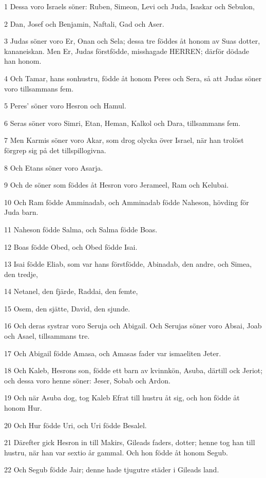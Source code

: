 \par 1 Dessa voro Israels söner: Ruben, Simeon, Levi och Juda, Isaskar och Sebulon,
\par 2 Dan, Josef och Benjamin, Naftali, Gad och Aser.
\par 3 Judas söner voro Er, Onan och Sela; dessa tre föddes åt honom av Suas dotter, kananeiskan. Men Er, Judas förstfödde, misshagade HERREN; därför dödade han honom.
\par 4 Och Tamar, hans sonhustru, födde åt honom Peres och Sera, så att Judas söner voro tillsammans fem.
\par 5 Peres' söner voro Hesron och Hamul.
\par 6 Seras söner voro Simri, Etan, Heman, Kalkol och Dara, tillsammans fem.
\par 7 Men Karmis söner voro Akar, som drog olycka över Israel, när han trolöst förgrep sig på det tillspillogivna.
\par 8 Och Etans söner voro Asarja.
\par 9 Och de söner som föddes åt Hesron voro Jerameel, Ram och Kelubai.
\par 10 Och Ram födde Amminadab, och Amminadab födde Naheson, hövding för Juda barn.
\par 11 Naheson födde Salma, och Salma födde Boas.
\par 12 Boas födde Obed, och Obed födde Isai.
\par 13 Isai födde Eliab, som var hans förstfödde, Abinadab, den andre, och Simea, den tredje,
\par 14 Netanel, den fjärde, Raddai, den femte,
\par 15 Osem, den sjätte, David, den sjunde.
\par 16 Och deras systrar voro Seruja och Abigail. Och Serujas söner voro Absai, Joab och Asael, tillsammans tre.
\par 17 Och Abigail födde Amasa, och Amasas fader var ismaeliten Jeter.
\par 18 Och Kaleb, Hesrons son, födde ett barn av kvinnkön, Asuba, därtill ock Jeriot; och dessa voro henne söner: Jeser, Sobab och Ardon.
\par 19 Och när Asuba dog, tog Kaleb Efrat till hustru åt sig, och hon födde åt honom Hur.
\par 20 Och Hur födde Uri, och Uri födde Besalel.
\par 21 Därefter gick Hesron in till Makirs, Gileads faders, dotter; henne tog han till hustru, när han var sextio år gammal. Och hon födde åt honom Segub.
\par 22 Och Segub födde Jair; denne hade tjugutre städer i Gileads land.
